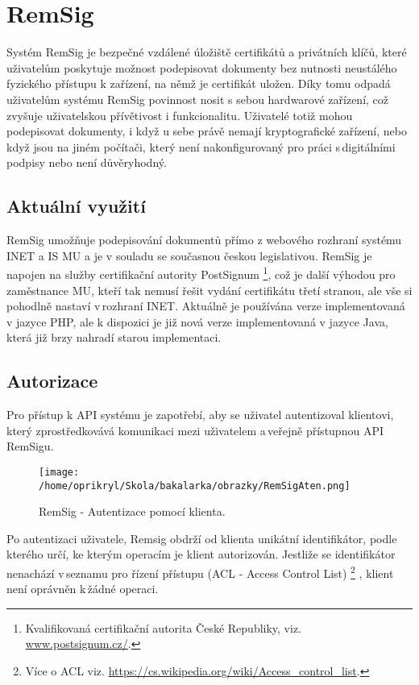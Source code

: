 \documentclass[]{fithesis3}
\begin{document}
\chapter{RemSig}

Systém RemSig je bezpečné vzdálené úložiště certifikátů a privátních klíčů, které uživatelům poskytuje možnost podepisovat dokumenty bez nutnosti neustálého fyzického přístupu k zařízení, na němž je certifikát uložen. Díky tomu odpadá uživatelům systému RemSig povinnost nosit s sebou hardwarové zařízení, což zvyšuje uživatelskou přívětivost i funkcionalitu. Uživatelé totiž mohou podepisovat dokumenty, i když u sebe právě nemají kryptografické zařízení, nebo když jsou na jiném počítači, který není nakonfigurovaný pro práci s\,digitálními podpisy nebo není důvěryhodný.

	\section{Aktuální využití}

		RemSig umožňuje podepisování dokumentů přímo z webového rozhraní systému INET
		a IS MU a je v souladu se současnou českou legislativou. RemSig je napojen na služby 				certifikační autority PostSignum
	\footnote{Kvalifikovaná certifikační autorita České Republiky, viz. \url{www.postsignum.cz/}.}, 			což je další výhodou pro zaměstnance MU, kteří tak nemusí řešit vydání certifikátu třetí 			stranou, ale vše si pohodlně nastaví v\,rozhraní INET. Aktuálně je používána verze 					implementovaná v jazyce PHP, ale k dispozici je již nová verze implementovaná v jazyce 			Java, která již brzy nahradí starou implementaci. 
	
	\section{Autorizace} 

	Pro přístup k API systému je zapotřebí, aby se uživatel autentizoval klientovi, který 				zprostředkovává komunikaci mezi uživatelem a\,veřejně přístupnou API RemSigu.  
	\begin{figure}[!h]
  	\begin{minipage}{1.00\textwidth}
    		\texttt{[image: /home/oprikryl/Skola/bakalarka/obrazky/RemSigAten.png]}
  	\end{minipage}
 	\caption{RemSig - Autentizace pomocí klienta.}
  	\label{fig:RemSig - Autentizace pomocí klienta.}
	\end{figure}
	Po autentizaci uživatele, Remsig obdrží od klienta unikátní identifikátor, podle kterého určí, ke 		kterým operacím je klient autorizován. Jestliže se identifikátor nenachází v\,seznamu pro řízení 		přístupu (ACL - Access Control List)
	\footnote{Více o ACL viz. \url{https://cs.wikipedia.org/wiki/Access_control_list}.} , klient není oprávněn k\,žádné operaci.
\end{document}
